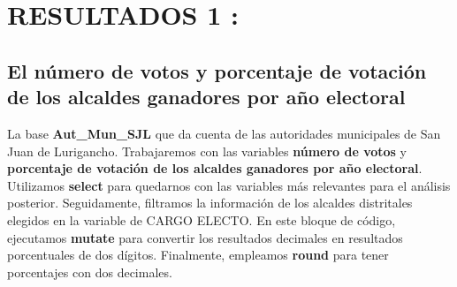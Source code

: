 \documentclass[
]{book}
\begin{document}
\hypertarget{resultados-1-1}{%
\section{RESULTADOS 1 :}\label{resultados-1-1}}

\hypertarget{el-nuxfamero-de-votos-y-porcentaje-de-votaciuxf3n-de-los-alcaldes-ganadores-por-auxf1o-electoral}{%
\subsection{El número de votos y porcentaje de votación de los alcaldes ganadores por año electoral}\label{el-nuxfamero-de-votos-y-porcentaje-de-votaciuxf3n-de-los-alcaldes-ganadores-por-auxf1o-electoral}}

La base \textbf{Aut\_Mun\_SJL} que da cuenta de las autoridades municipales de San Juan de Lurigancho. Trabajaremos con las variables \textbf{número de votos} y \textbf{porcentaje de votación de los alcaldes ganadores por año electoral}. Utilizamos \textbf{select} para quedarnos con las variables más relevantes para el análisis posterior. Seguidamente, filtramos la información de los alcaldes distritales elegidos en la variable de CARGO ELECTO. En este bloque de código, ejecutamos \textbf{mutate} para convertir los resultados decimales en resultados porcentuales de dos dígitos. Finalmente, empleamos \textbf{round} para tener porcentajes con dos decimales.
\end{document}
